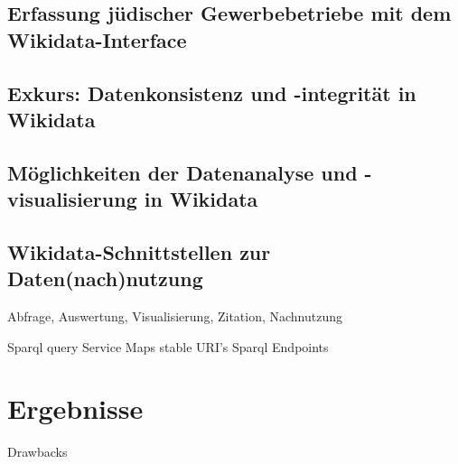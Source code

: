 \subsection{Erfassung jüdischer Gewerbebetriebe mit dem Wikidata-Interface}

\subsection{Exkurs: Datenkonsistenz und -integrität in Wikidata}

\subsection{Möglichkeiten der Datenanalyse und -visualisierung in Wikidata}

\subsection{Wikidata-Schnittstellen zur Daten(nach)nutzung}

Abfrage, Auswertung, Visualisierung, Zitation, Nachnutzung

Sparql query Service
Maps
stable URI's
Sparql Endpoints

\section{Ergebnisse}

Drawbacks